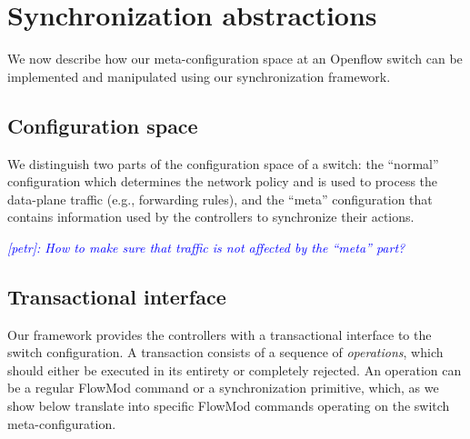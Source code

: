 \documentclass[conference]{sigcomm-alternate}
\newcommand{\petr}[1]{\textit{\textcolor{blue}{[petr]: #1}}} %
\begin{document}

\section{Synchronization abstractions}\label{sec:main}

We now describe how our  meta-configuration space at
an Openflow switch can be implemented and manipulated using our
synchronization framework. 


\subsection{Configuration space}

We distinguish two parts of the configuration space of a switch:
the ``normal'' configuration which determines the network policy and
is used to process the data-plane traffic (e.g., forwarding rules), 
and the ``meta'' configuration that contains information used by the
controllers to synchronize their actions.

\petr{How to make sure that traffic is not affected by the ``meta'' part?}

\subsection{Transactional interface}
 
Our framework provides the controllers with a transactional interface to the
switch configuration.     
A transaction consists of a sequence of \emph{operations}, which
should either be executed in its entirety or completely rejected. 
An operation can be a regular FlowMod command or a synchronization
primitive, which, as we
show below translate into specific FlowMod commands operating on the
switch meta-configuration. 
\end{document}
